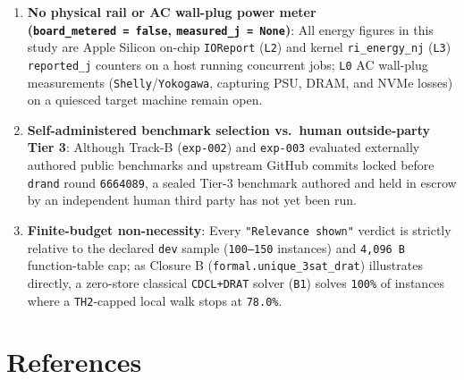 \documentclass[10pt,letterpaper]{article}
\providecommand{\tightlist}{\setlength{\itemsep}{1pt}\setlength{\parskip}{0pt}}
\begin{document}
\begin{enumerate}
\def\labelenumi{\arabic{enumi}.}
\tightlist
\item
  \textbf{No physical rail or AC wall-plug power meter
  (\texttt{board\_\allowbreak{}metered\ =\ false}, \texttt{measured\_\allowbreak{}j\ =\ None})}:
  All energy figures in this study are Apple Silicon on-chip
  \texttt{IOReport} (\texttt{L2}) and kernel \texttt{ri\_\allowbreak{}energy\_\allowbreak{}nj}
  (\texttt{L3}) \texttt{reported\_\allowbreak{}j} counters on a host running
  concurrent jobs; \texttt{L0} AC wall-plug measurements
  (\texttt{Shelly}/\allowbreak{}\texttt{Yokogawa}, capturing PSU, DRAM, and NVMe
  losses) on a quiesced target machine remain open.
\item
  \textbf{Self-administered benchmark selection vs.~human outside-party
  Tier 3}: Although Track-B (\texttt{exp-002}) and \texttt{exp-003}
  evaluated externally authored public benchmarks and upstream GitHub
  commits locked before \texttt{drand} round \texttt{6664089}, a sealed
  Tier-3 benchmark authored and held in escrow by an independent human
  third party has not yet been run.
\item
  \textbf{Finite-budget non-necessity}: Every
  \texttt{"Relevance\ shown"} verdict is strictly relative to the
  declared \texttt{dev} sample (\texttt{100–150} instances) and
  \texttt{4,096\ B} function-table cap; as Closure B
  (\texttt{formal.\allowbreak{}unique\_\allowbreak{}3sat\_\allowbreak{}drat}) illustrates directly, a
  zero-store classical \texttt{CDCL+DRAT} solver (\texttt{B1}) solves
  \texttt{100\%} of instances where a \texttt{TH2}-capped local walk
  stops at \texttt{78.0\%}.
\end{enumerate}

\section{References}\label{references}
\end{document}
